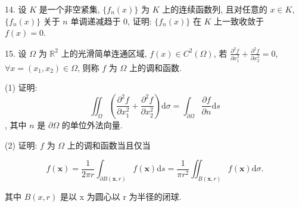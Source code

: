 \documentclass{examcollection}
\renewcommand{\displayformula}[1]{\[#1\]}
\begin{document}
{\begin{minipage}{\textwidth}
14. 设 $K$ 是一个非空紧集, $\{f_n(x)\}$ 为 $K$ 上的连续函数列, 且对任意的 $x \in K$, $\{f_n(x)\}$ 关于 $n$ 单调递减趋于 0, 证明: $\{f_n(x)\}$ 在 $K$ 上一致收敛于 $f(x) = 0$.\par
15. 设 $\Omega$ 为 $\mathbb{R}^2$ 上的光滑简单连通区域, $f(x) \in C^2(\Omega)$, 若 $\frac{\partial^2 f}{\partial x_1^2} + \frac{\partial^2 f}{\partial x_2^2} = 0$, $\forall x = (x_1, x_2) \in \Omega$, 则称 $f$ 为 $\Omega$ 上的调和函数.\par
(1) 证明: \displayformula{\iint_{\Omega} \left( \frac{\partial^2 f}{\partial x_1^2} + \frac{\partial^2 f}{\partial x_2^2} \right) \mathrm{d}\sigma = \int_{\partial \Omega} \frac{\partial f}{\partial n} \mathrm{d}s}, 其中 $n$ 是 $\partial \Omega$ 的单位外法向量.\par
(2) 证明: $f$ 为 $\Omega$ 上的调和函数当且仅当\par
\displayformula{f (\boldsymbol {x}) = \frac {1}{2 \pi r} \int_ {\partial B (\boldsymbol {x}, r)} f (\boldsymbol {x}) \mathrm{d} s = \frac {1}{\pi r ^ {2}} \iint_ {B (\boldsymbol {x}, r)} f (\boldsymbol {x}) \mathrm{d} \sigma .}\par
其中  $B(x,r)$  是以 x 为圆心以 r 为半径的闭球.\par
\end{minipage}}
\ifdim\dimexpr\ht\proofbox+\dp\proofbox\relax>\textheight
\noindent\resizebox{!}{\textheight}{\usebox{\proofbox}}\else\noindent\usebox{\proofbox}\fi\clearpage
\end{document}
